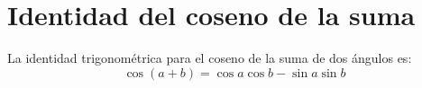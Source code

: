 \section{Identidad del coseno de la suma}\label{sec:identidad}

\begin{theorem}
La identidad trigonométrica para el coseno de la suma de dos ángulos es:
\begin{equation}\label{eq:coseno_suma}
\cos(a + b) = \cos a \cos b - \sin a \sin b
\end{equation}
\end{theorem}
